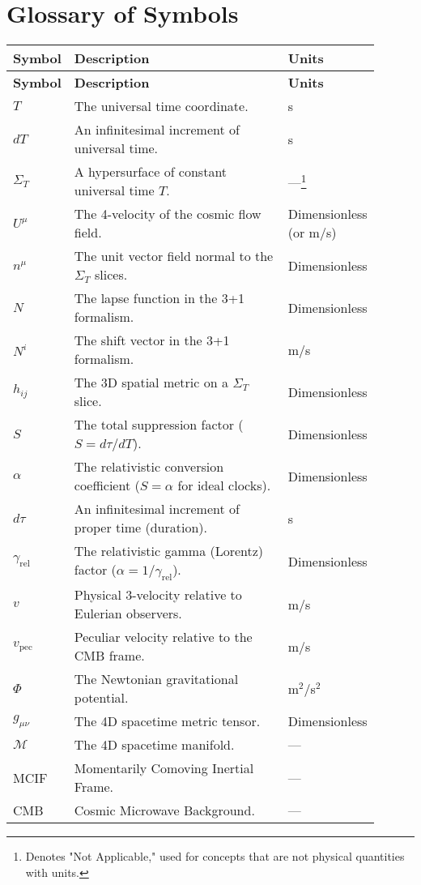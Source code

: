 \documentclass[12pt]{article}
\theoremstyle{plain} %
\begin{document}
\section{Glossary of Symbols}
\vspace{-1.0em}
\begin{longtable}{p{0.15\linewidth} p{0.6\linewidth} p{0.15\linewidth}}
    \toprule
    \textbf{Symbol} & \textbf{Description} & \textbf{Units} \\
    \midrule
    \endfirsthead
    \toprule
    \textbf{Symbol} & \textbf{Description} & \textbf{Units} \\
    \midrule
    \endhead
    $T$ & The universal time coordinate. & s \\
    $dT$ & An infinitesimal increment of universal time. & s \\
    $\Sigma_T$ & A hypersurface of constant universal time $T$. & ---\footnote{Denotes "Not Applicable," used for concepts that are not physical quantities with units.} \\
    $U^\mu$ & The 4-velocity of the cosmic flow field. & Dimensionless (or m/s) \\
    $n^\mu$ & The unit vector field normal to the $\Sigma_T$ slices. & Dimensionless \\
    $N$ & The lapse function in the 3+1 formalism. & Dimensionless \\
    $N^i$ & The shift vector in the 3+1 formalism. & m/s \\
    $h_{ij}$ & The 3D spatial metric on a $\Sigma_T$ slice. & Dimensionless \\
    $S$ & The total suppression factor ($S = d\tau/dT$). & Dimensionless \\
    $\alpha$ & The relativistic conversion coefficient ($S=\alpha$ for ideal clocks). & Dimensionless \\
    $d\tau$ & An infinitesimal increment of proper time (duration). & s \\
    $\gamma_{\mathrm{rel}}$ & The relativistic gamma (Lorentz) factor ($\alpha = 1/\gamma_{\mathrm{rel}}$). & Dimensionless \\
    $v$ & Physical 3-velocity relative to Eulerian observers. & m/s \\
    $v_{\mathrm{pec}}$ & Peculiar velocity relative to the CMB frame. & m/s \\
    $\Phi$ & The Newtonian gravitational potential. & m$^2$/s$^2$ \\
    $g_{\mu\nu}$ & The 4D spacetime metric tensor. & Dimensionless \\
    $\mathcal{M}$ & The 4D spacetime manifold. & --- \\
    MCIF & Momentarily Comoving Inertial Frame. & --- \\
    CMB & Cosmic Microwave Background. & --- \\
    \bottomrule
\end{longtable}
\end{document}
